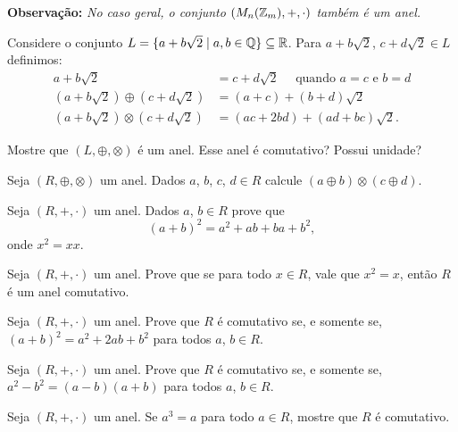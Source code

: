 \documentclass[12pt]{exam}
\begin{document}
    \vspace{.2cm}

    \textbf{Observação: }\textit{No caso geral, o conjunto $(M_n(\mathbb{Z}_m), + , \cdot)$ também é um anel.}

    \vspace{.3cm}

    \questao{} Considere o conjunto $L = \{ a + b\sqrt{2} \mid a, b \in \mathbb{Q}\} \subseteq \mathbb{R}$. Para $a + b\sqrt{2}$, $c + d\sqrt{2} \in L$ definimos:
    \begin{align*}
        a + b\sqrt{2} &= c + d\sqrt{2} \quad \mbox{ quando } a = c \mbox{ e } b = d\\
        (a + b\sqrt{2}) \oplus (c + d\sqrt{2}) &= (a + c) + (b + d)\sqrt{2}\\
        (a + b\sqrt{2}) \otimes (c + d\sqrt{2}) &= (ac + 2bd) + (ad + bc)\sqrt{2}.
    \end{align*}

    Mostre que $(L, \oplus, \otimes)$ é um anel. Esse anel é comutativo? Possui unidade?

    \vspace{.3cm}

    \questao{} Seja $(R, \oplus, \otimes)$ um anel. Dados $a$, $b$, $c$, $d \in R$ calcule $(a \oplus b)\otimes (c \oplus d)$.

    \vspace{.3cm}

    \questao{} Seja $(R, +, \cdot)$ um anel. Dados $a$, $b \in R$ prove que
    \[
        (a + b)^2 = a^2 + ab + ba + b^2,
    \]
    onde $x^2 = xx$.

    \vspace{.3cm}

    \questao{} Seja $(R, +, \cdot)$ um anel. Prove que se para todo $x \in R$, vale que $x^2 = x$, então $R$ é um anel comutativo.

    \vspace{.3cm}

    \questao{} Seja $(R, +, \cdot)$ um anel. Prove que $R$ é comutativo se, e somente se, $(a + b)^2 = a^2 + 2ab + b^2$ para todos $a$, $b \in R$.

    \vspace{.3cm}

    \questao{} Seja $(R, +, \cdot)$ um anel. Prove que $R$ é comutativo se, e somente se, $a^2 - b^2 = (a - b)(a + b)$ para todos $a$, $b \in R$.

    \vspace{.3cm}

    \questao{} Seja $(R, +, \cdot)$ um anel. Se $a^3 = a$ para todo $a \in R$, mostre que $R$ é comutativo.

    \vspace{1cm}
\end{document}

